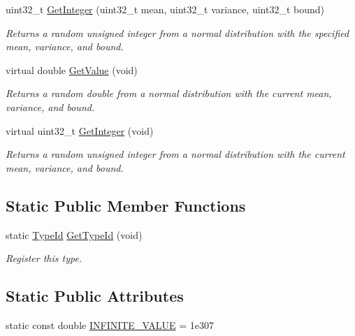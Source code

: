 \begin{DoxyCompactItemize}
uint32\+\_\+t \hyperlink{classns3_1_1NormalRandomVariable_aed34239c507694029afc7af98eab0672}{Get\+Integer} (uint32\+\_\+t mean, uint32\+\_\+t variance, uint32\+\_\+t bound)
\begin{DoxyCompactList}\small\item\em Returns a random unsigned integer from a normal distribution with the specified mean, variance, and bound. \end{DoxyCompactList}\item 
virtual double \hyperlink{classns3_1_1NormalRandomVariable_ab2a04ca1bd9177ecdc7530e525c216e3}{Get\+Value} (void)
\begin{DoxyCompactList}\small\item\em Returns a random double from a normal distribution with the current mean, variance, and bound. \end{DoxyCompactList}\item 
virtual uint32\+\_\+t \hyperlink{classns3_1_1NormalRandomVariable_a3e23038dcec647c9ae4f4bd457384040}{Get\+Integer} (void)
\begin{DoxyCompactList}\small\item\em Returns a random unsigned integer from a normal distribution with the current mean, variance, and bound. \end{DoxyCompactList}\end{DoxyCompactItemize}
\subsection*{Static Public Member Functions}
\begin{DoxyCompactItemize}
\item 
static \hyperlink{classns3_1_1TypeId}{Type\+Id} \hyperlink{classns3_1_1NormalRandomVariable_a413de1185269692d092ff5e3fa5b6878}{Get\+Type\+Id} (void)
\begin{DoxyCompactList}\small\item\em Register this type. \end{DoxyCompactList}\end{DoxyCompactItemize}
\subsection*{Static Public Attributes}
\begin{DoxyCompactItemize}
\item 
static const double \hyperlink{classns3_1_1NormalRandomVariable_a813486b91a0d043421a54e47f112b343}{I\+N\+F\+I\+N\+I\+T\+E\+\_\+\+V\+A\+L\+UE} = 1e307
\end{DoxyCompactItemize}
